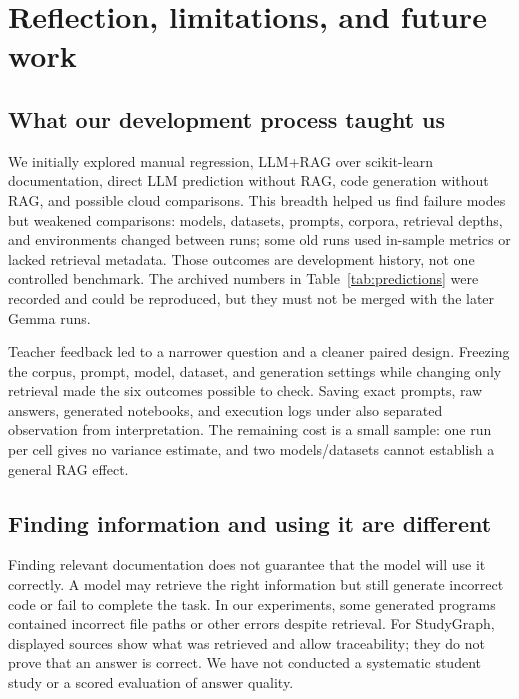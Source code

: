 \section{Reflection, limitations, and future work}
\subsection{What our development process taught us}
We initially explored manual regression, LLM+RAG over scikit-learn documentation, direct LLM prediction without RAG, code generation
without RAG, and possible cloud comparisons.
This breadth helped us find failure modes but weakened comparisons: models, datasets, prompts, corpora, retrieval depths, and environments
changed between runs; some old runs used in-sample metrics or lacked retrieval metadata.
Those outcomes are development history, not one controlled benchmark.
The archived numbers in Table~\ref{tab:predictions} were recorded and could be reproduced, but they must not be merged with the later Gemma runs.

Teacher feedback led to a narrower question and a cleaner paired design.
Freezing the corpus, prompt, model, dataset, and generation settings while changing only retrieval made the six outcomes possible to check.
Saving exact prompts, raw answers, generated notebooks, and execution logs under
 also separated observation from interpretation.
The remaining cost is a small sample: one run per cell gives no variance estimate, and two models/datasets cannot establish a general RAG effect.

\subsection{Finding information and using it are different}
Finding relevant documentation does not guarantee that the model will use it correctly.
A model may retrieve the right information but still generate incorrect code or fail to complete the task.
In our experiments, some generated programs contained incorrect file paths or other errors despite retrieval.
For StudyGraph, displayed sources show what was retrieved and allow traceability; they do not prove that an answer is correct.
We have not conducted a systematic student study or a scored evaluation of answer quality.

